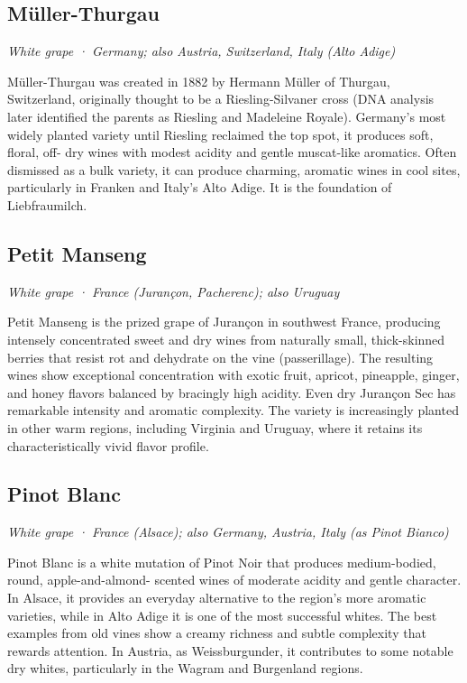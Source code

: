 \subsection*{Müller-Thurgau}
\textit{White grape · Germany; also Austria, Switzerland, Italy (Alto Adige)}\par\smallskip

Müller-Thurgau was created in 1882 by Hermann Müller of Thurgau, Switzerland, originally thought to be a Riesling-Silvaner cross (DNA analysis later identified the parents as Riesling and Madeleine Royale). Germany’s most widely planted variety until Riesling reclaimed the top spot, it produces soft, floral, off- dry wines with modest acidity and gentle muscat-like aromatics. Often dismissed as a bulk variety, it can produce charming, aromatic wines in cool sites, particularly in Franken and Italy’s Alto Adige. It is the foundation of Liebfraumilch.

\subsection*{Petit Manseng}
\textit{White grape · France (Jurançon, Pacherenc); also Uruguay}\par\smallskip

Petit Manseng is the prized grape of Jurançon in southwest France, producing intensely concentrated sweet and dry wines from naturally small, thick-skinned berries that resist rot and dehydrate on the vine (passerillage). The resulting wines show exceptional concentration with exotic fruit, apricot, pineapple, ginger, and honey flavors balanced by bracingly high acidity. Even dry Jurançon Sec has remarkable intensity and aromatic complexity. The variety is increasingly planted in other warm regions, including Virginia and Uruguay, where it retains its characteristically vivid flavor profile.

\subsection*{Pinot Blanc}
\textit{White grape · France (Alsace); also Germany, Austria, Italy (as Pinot Bianco)}\par\smallskip

Pinot Blanc is a white mutation of Pinot Noir that produces medium-bodied, round, apple-and-almond- scented wines of moderate acidity and gentle character. In Alsace, it provides an everyday alternative to the region’s more aromatic varieties, while in Alto Adige it is one of the most successful whites. The best examples from old vines show a creamy richness and subtle complexity that rewards attention. In Austria, as Weissburgunder, it contributes to some notable dry whites, particularly in the Wagram and Burgenland regions.

